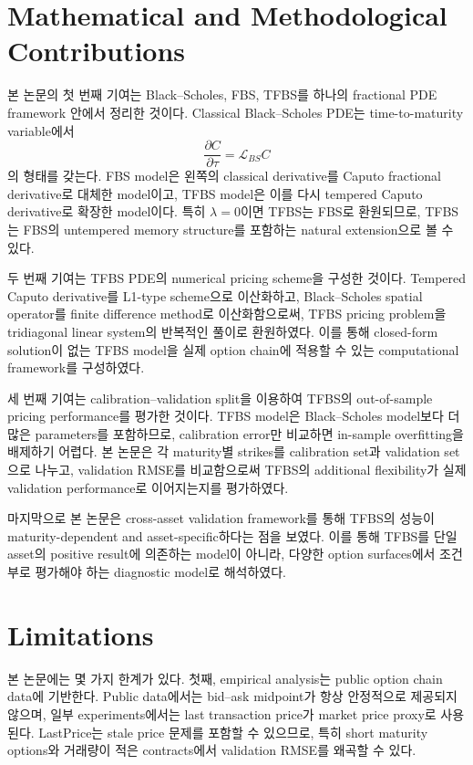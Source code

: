 \documentclass[11pt,a4paper]{report}
\begin{document}
\section{Mathematical and Methodological Contributions}

본 논문의 첫 번째 기여는 Black--Scholes, FBS, TFBS를 하나의 fractional PDE framework 안에서 정리한 것이다. Classical Black--Scholes PDE는 time-to-maturity variable에서
\[
\frac{\partial C}{\partial \tau}
=
\mathcal{L}_{BS}C
\]
의 형태를 갖는다. FBS model은 왼쪽의 classical derivative를 Caputo fractional derivative로 대체한 model이고, TFBS model은 이를 다시 tempered Caputo derivative로 확장한 model이다. 특히 \(\lambda=0\)이면 TFBS는 FBS로 환원되므로, TFBS는 FBS의 untempered memory structure를 포함하는 natural extension으로 볼 수 있다.

두 번째 기여는 TFBS PDE의 numerical pricing scheme을 구성한 것이다. Tempered Caputo derivative를 L1-type scheme으로 이산화하고, Black--Scholes spatial operator를 finite difference method로 이산화함으로써, TFBS pricing problem을 tridiagonal linear system의 반복적인 풀이로 환원하였다. 이를 통해 closed-form solution이 없는 TFBS model을 실제 option chain에 적용할 수 있는 computational framework를 구성하였다.

세 번째 기여는 calibration--validation split을 이용하여 TFBS의 out-of-sample pricing performance를 평가한 것이다. TFBS model은 Black--Scholes model보다 더 많은 parameters를 포함하므로, calibration error만 비교하면 in-sample overfitting을 배제하기 어렵다. 본 논문은 각 maturity별 strikes를 calibration set과 validation set으로 나누고, validation RMSE를 비교함으로써 TFBS의 additional flexibility가 실제 validation performance로 이어지는지를 평가하였다.

마지막으로 본 논문은 cross-asset validation framework를 통해 TFBS의 성능이 maturity-dependent and asset-specific하다는 점을 보였다. 이를 통해 TFBS를 단일 asset의 positive result에 의존하는 model이 아니라, 다양한 option surfaces에서 조건부로 평가해야 하는 diagnostic model로 해석하였다.

\section{Limitations}

본 논문에는 몇 가지 한계가 있다. 첫째, empirical analysis는 public option chain data에 기반한다. Public data에서는 bid--ask midpoint가 항상 안정적으로 제공되지 않으며, 일부 experiments에서는 last transaction price가 market price proxy로 사용된다. LastPrice는 stale price 문제를 포함할 수 있으므로, 특히 short maturity options와 거래량이 적은 contracts에서 validation RMSE를 왜곡할 수 있다.
\end{document}
